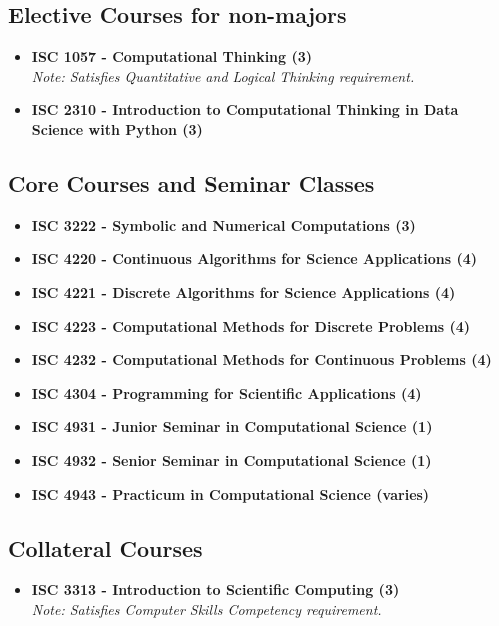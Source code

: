 \documentclass[12pt,a4paper]{article}
\begin{document}
\subsection*{Elective Courses for non-majors}
\begin{itemize}
    \item \textbf{ISC 1057 - Computational Thinking (3)} \\ \textit{Note: Satisfies Quantitative and Logical Thinking requirement.}
    \item \textbf{ISC 2310 - Introduction to Computational Thinking in Data Science with Python (3)}
\end{itemize}

\subsection*{Core Courses and Seminar Classes}
\begin{itemize}
    \item \textbf{ISC 3222 - Symbolic and Numerical Computations (3)}
    \item \textbf{ISC 4220 - Continuous Algorithms for Science Applications (4)}
    \item \textbf{ISC 4221 - Discrete Algorithms for Science Applications (4)}
    \item \textbf{ISC 4223 - Computational Methods for Discrete Problems (4)}
    \item \textbf{ISC 4232 - Computational Methods for Continuous Problems (4)}
    \item \textbf{ISC 4304 - Programming for Scientific Applications (4)}
    \item \textbf{ISC 4931 - Junior Seminar in Computational Science (1)}
    \item \textbf{ISC 4932 - Senior Seminar in Computational Science (1)}
    \item \textbf{ISC 4943 - Practicum in Computational Science (varies)}
\end{itemize}

\subsection*{Collateral Courses}
\begin{itemize}
    \item \textbf{ISC 3313 - Introduction to Scientific Computing (3)} \\ \textit{Note: Satisfies Computer Skills Competency requirement.}
\end{itemize}
\end{document}
